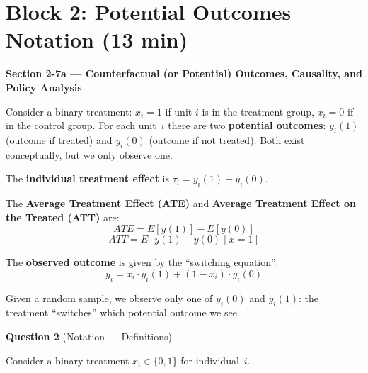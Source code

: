 \documentclass[11pt,a4paper]{article}
\begin{document}
\section{Block 2: Potential Outcomes Notation \textnormal{(13 min)}}

\begin{bookexample}
\textbf{\color{blockcolor}Section 2-7a --- Counterfactual (or Potential) Outcomes, Causality, and Policy Analysis}

\smallskip
Consider a binary treatment: $x_i = 1$ if unit $i$ is in the treatment group, $x_i = 0$ if in the control group. For each unit~$i$ there are two \textbf{potential outcomes}: $y_i(1)$ (outcome if treated) and $y_i(0)$ (outcome if not treated). Both exist conceptually, but we only observe one.

The \textbf{individual treatment effect} is $\tau_i = y_i(1) - y_i(0)$.

The \textbf{Average Treatment Effect (ATE)} and \textbf{Average Treatment Effect on the Treated (ATT)} are:
\begin{equation}
  ATE = E[y(1)] - E[y(0)] \tag{2.75}
\end{equation}
\begin{equation}
  ATT = E[y(1) - y(0) \mid x = 1] \tag{2.76}
\end{equation}

The \textbf{observed outcome} is given by the ``switching equation'':
\begin{equation}
  y_i = x_i \cdot y_i(1) + (1 - x_i) \cdot y_i(0) \tag{2.77}
\end{equation}

Given a random sample, we observe only one of $y_i(0)$ and $y_i(1)$: the treatment ``switches'' which potential outcome we see.
\end{bookexample}

\bigskip
\textbf{Question 2} (Notation --- Definitions)

\medskip
Consider a binary treatment $x_i \in \{0,1\}$ for individual~$i$.
\end{document}
